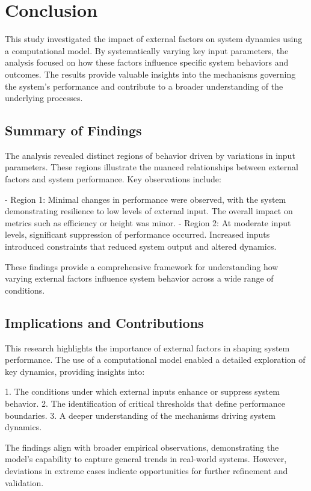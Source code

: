 \chapter{Conclusion}

\fancyfoot[C]{\thepage}

This study investigated the impact of external factors on system dynamics using a computational model. By systematically varying key input parameters, the analysis focused on how these factors influence specific system behaviors and outcomes. The results provide valuable insights into the mechanisms governing the system's performance and contribute to a broader understanding of the underlying processes.

\section{Summary of Findings}
The analysis revealed distinct regions of behavior driven by variations in input parameters. These regions illustrate the nuanced relationships between external factors and system performance. Key observations include:

- Region 1: Minimal changes in performance were observed, with the system demonstrating resilience to low levels of external input. The overall impact on metrics such as efficiency or height was minor.
- Region 2: At moderate input levels, significant suppression of performance occurred. Increased inputs introduced constraints that reduced system output and altered dynamics.

These findings provide a comprehensive framework for understanding how varying external factors influence system behavior across a wide range of conditions.

\section{Implications and Contributions}
This research highlights the importance of external factors in shaping system performance. The use of a computational model enabled a detailed exploration of key dynamics, providing insights into:

1. The conditions under which external inputs enhance or suppress system behavior.
2. The identification of critical thresholds that define performance boundaries.
3. A deeper understanding of the mechanisms driving system dynamics.

The findings align with broader empirical observations, demonstrating the model's capability to capture general trends in real-world systems. However, deviations in extreme cases indicate opportunities for further refinement and validation.

